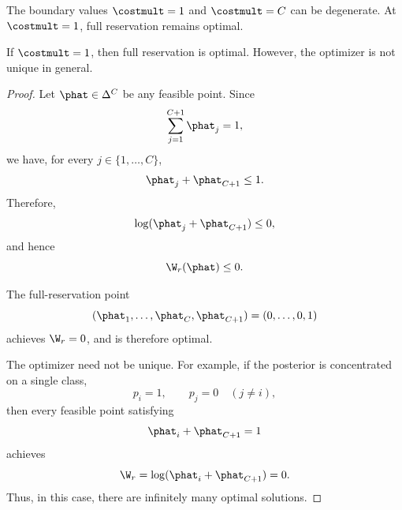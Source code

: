 



\begin{remark}
    The boundary values \(\costmult=1\) and \(\costmult=C\) can be degenerate.
    At \(\costmult=1\), full reservation remains optimal.
\end{remark}

If \(\costmult=1\), then full reservation is optimal. However, the optimizer is not unique in general.
\begin{proof}
    Let \(\phat\in\Delta^C\) be any feasible point. Since
    \[
        \sum_{j=1}^{C+1}\phat_j=1,
    \]
    we have, for every \(j\in\{1,\ldots,C\}\),
    \[
        \phat_j+\phat_{C+1}\le1.
    \]
    Therefore,
    \[
        \log(\phat_j+\phat_{C+1})\le0,
    \]
    and hence
    \[
        \W_r(\phat)\le0.
    \]

    The full-reservation point
    \[
        (\phat_1,\ldots,\phat_C,\phat_{C+1})
        =
        (0,\ldots,0,1)
    \]
    achieves \(\W_r=0\), and is therefore optimal.

    The optimizer need not be unique. For example, if the posterior is
    concentrated on a single class,
    \[
        p_i=1,
        \qquad
        p_j=0
        \quad (j\neq i),
    \]
    then every feasible point satisfying
    \[
        \phat_i+\phat_{C+1}=1
    \]
    achieves
    \[
        \W_r
        =
        \log(\phat_i+\phat_{C+1})
        =
        0.
    \]
    Thus, in this case, there are infinitely many optimal solutions.
\end{proof}

